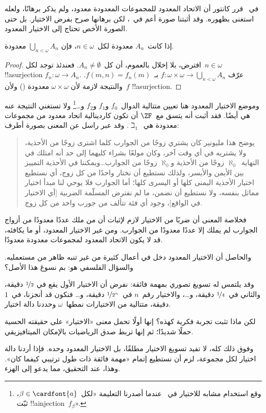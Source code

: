 \documentclass[../../../include/open-logic-section]{subfiles}
\begin{document}
\begin{ex}
في~\citeyear{Cantor1878} قرر كانتور أن الاتحاد المعدود للمجموعات
المعدودة معدود، ولم يذكر برهانًا، ولعله استغنى بظهوره. وقد أثبتنا صورة
أعم في~، لكن برهانها
صرح بفرض الاختيار. بل حتى الصورة الأخص تحتاج إلى الاختيار المعدود.

\begin{thm}
إذا كانت~$A_n$ معدودة لكل~$n \in \omega$، فإن
$\bigcup_{n < \omega} A_n$ معدودة.
\end{thm}

\begin{proof}
افترض، بلا إخلال بالعموم، أن كل~$A_n \neq \emptyset$. فعندئذ توجد
لكل~$n \in \omega$ !!a{surjection}
$f_n \colon \omega \to A_n$. عرّف
$f \colon \omega \times \omega \to \bigcup_{n < \omega} A_n$
بـ~$f(m, n) = f_n(m)$. والنتيجة لازمة لأن
$\omega \times \omega$ معدودة
() ولأن~$f$
!!a{surjection}.
\end{proof}
\noindent
وموضع الاختيار المعدود هنا تعيين متتالية الدوال~$f_0$ و$f_1$ و$f_2$
و\dots\footnote{وقع استخدام مشابه
للاختيار في~ عندما
أصدرنا التعليمة «لكل~$\beta \in \cardfont{a}$، ثبّت
!!a{injection}~$f_\beta$».} ولا تستغني النتيجة عنه هي أيضًا. فقد أثبت
\citet{FefermanLevy1963} أنه يتسق مع~$\ZF$ أن تكون كاردينالية اتحاد
معدود من مجموعات معدودة هي~$\beth_1$. وقد عبر راسل عن المعنى بصورة
أطرف:
\begin{quote}
  يوضح هذا مليونير كان يشتري زوجًا من الجوارب كلما اشترى زوجًا من
  الأحذية، ولا يشتريه في أي وقت آخر، وكان مولعًا بشراء كليهما إلى حد
  أنه امتلك في النهاية~$\aleph_0$ زوجًا من الأحذية و$\aleph_0$ زوجًا
  من الجوارب\dots\@ ويمكننا في الأحذية التمييز بين الأيمن والأيسر،
  ولذلك نستطيع أن نختار واحدًا من كل زوج، أي نستطيع اختيار الأحذية
  اليمنى كلها أو اليسرى كلها؛ أما الجوارب فلا يوحي لنا مبدأ اختيار
  مماثل بنفسه، ولا نستطيع أن نضمن، ما لم نفترض المسلّمة الضربية [أي
  الاختيار في الواقع]، وجود أي فئة تتألف من جورب واحد من كل زوج.
  \citep[p.~126]{Russell1919}
\end{quote}
فخلاصة المعنى أن ضربًا من الاختيار لازم لإثبات أن من ملك عددًا معدودًا
من أزواج الجوارب لم يملك إلا عددًا معدودًا من الجوارب. ومن غير
الاختيار المعدود، أو ما يكافئه، قد لا يكون الاتحاد المعدود لمجموعات
معدودة معدودًا.
\end{ex}

والحاصل أن الاختيار المعدود دخل في أعمال كثيرة من غير تنبه ظاهر من
مستعمليه. والسؤال الفلسفي هو: بم نسوغ هذا الأصل؟

وقد يلتمس له تسويغ تصوري بمهمة فائقة: نفرض أن الاختيار الأول يقع في
$\nicefrac{1}{2}$ دقيقة، والثاني في~$\nicefrac{1}{4}$ دقيقة،
و\dots، والاختيار رقم~$n$ في~$\nicefrac{1}{2^n}$ دقيقة، و\dots\@
فنكون قد أنجزنا، في~$1$ دقيقة، متتالية من الاختيارات نمطها~$\omega$
وحددنا دالة اختيار.

لكن ماذا تثبت تجربة فكرية كهذه؟ إنها أولًا تحمل معنى «الاختيار» على
حقيقته الحسية حملًا شديدًا؛ ثم إنها تربط صدق الرياضيات بالإمكان
الميتافيزيقي.

وفوق ذلك كله، لا تفيد تسويغ الاختيار مطلقًا، بل الاختيار المعدود وحده.
فإذا أردنا دالة اختيار لكل مجموعة، لزم أن نستطيع إتمام «مهمة فائقة ذات
طول ترتيبي كيفما كان». وهذا، عند التحقيق، مما يدعو إلى الهزء.
\end{document}
